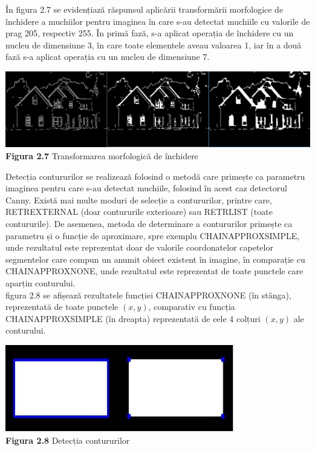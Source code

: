 \documentclass[a4paper,12pt]{report}
\newcommand\tab[1][1cm]{\hspace*{#1}}
\begin{document}
\tab În figura 2.7 se evidențiază răspunsul aplicării transformării morfologice de închidere a muchiilor pentru imaginea în care s-au detectat muchiile cu valorile de prag 205, respectiv 255. În primă fază, s-a aplicat operația de închidere cu un nucleu de dimensiune 3,
în care toate elementele aveau valoarea 1, iar în a două fază s-a aplicat operația cu un nucleu de dimensiune 7.
\begin {center} 
	\begin {footnotesize} 
		\includegraphics[width = 160mm]{fig2_7} \\
		\textbf  {Figura 2.7} Transformarea morfologică de închidere
	\end {footnotesize} 
\end {center}
\tab Detecția contururilor se realizează folosind o metodă care primește ca parametru imaginea pentru care s-au detectat muchiile, folosind în acest caz detectorul Canny. Există mai multe moduri de selecție a contururilor, printre care, RETR\textunderscore EXTERNAL
(doar contururile exterioare) sau RETR\textunderscore LIST (toate contururile). De asemenea, metoda de determinare a contururilor primește ca parametru și o funcție de aproximare, spre exemplu CHAIN\textunderscore APPROX\textunderscore SIMPLE, unde rezultatul este reprezentat doar de valorile coordonatelor capetelor segmentelor care compun un anumit obiect existent în imagine, în comparație cu CHAIN\textunderscore APPROX\textunderscore NONE, unde rezultatul este reprezentat de toate punctele care aparțin conturului. 
\\  figura 2.8 se afișează rezultatele funcției CHAIN\textunderscore APPROX\textunderscore NONE (în stânga), reprezentată de toate punctele $(x,y)$, comparativ cu funcția CHAIN\textunderscore APPROX\textunderscore SIMPLE (în dreapta) reprezentată de cele 4 colțuri $(x,y)$ ale conturului.
\begin {center} 
	\begin {footnotesize} 
		\includegraphics[width = 100mm]{fig2_8} \\
		\textbf  {Figura 2.8} Detecția contururilor\cite{opencv2}
	\end {footnotesize} 
\end {center}
\end{document}
